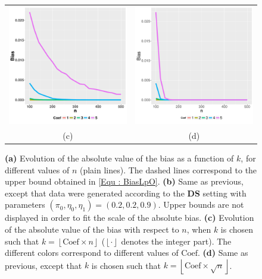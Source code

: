 \documentclass[twoside,11pt]{article}
\numberwithin{equation}{section}
\newcommand{\floor}[1]{\left\lfloor #1 \right\rfloor}
\newcommand{\1}{\mathds{1}}%
\numberwithin{equation}{section}
\theoremstyle{plain}
\begin{document}
\begin{figure}
\begin{tabular}{cc}
\includegraphics[width=8cm]{./Bias_Varyingk_linear_Pi05_EtaA0_EtaB1_ggplot} &
\includegraphics[width=8cm]{./Bias_Varyingk_sqrt_Pi05_EtaA0_EtaB1_ggplot}\\
(c) & (d)
\end{tabular}
\caption{{\bf (a)} Evolution of the absolute value of the bias as a function of $k$, for different values of $n$ (plain lines). The dashed lines correspond to the upper bound obtained in \eqref{Equ : BiasLpO}.
	{\bf (b)} Same as previous, except that data were generated according to the \textbf{DS} setting with parameters $(\pi_0,\eta_0,\eta_1)=(0.2,0.2,0.9)$. Upper bounds are not displayed in order to fit the scale of the absolute bias.
{\bf (c)} Evolution of the absolute value of the bias with respect to $n$, when $k$ is chosen such that $k= \floor{\mbox{Coef} \times n }$ ($\floor{\cdot}$ denotes the integer part). The different colors correspond to different values of $\mbox{Coef}$.
%
{\bf (d)} Same as previous, except that $k$ is chosen such that $k=\floor{\mbox{Coef} \times \sqrt{n}}$.}
\label{Fig: EvolBias}
\end{figure}
\end{document}
